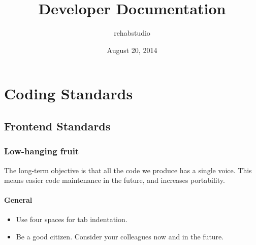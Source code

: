 \documentclass[letterpaper,10pt,english]{sphinxmanual}
\title{Developer Documentation}
\date{August 20, 2014}
\author{rehabstudio}
\begin{document}
\maketitle
\tableofcontents
{}\label{index::doc}



\chapter{Coding Standards}
\label{coding_standards/index:coding-standards}\label{coding_standards/index::doc}\label{coding_standards/index:rehabstudio-developers-documentation}

\section{Frontend Standards}
\label{coding_standards/frontend_standards:frontend-standards}\label{coding_standards/frontend_standards::doc}

\subsection{Low-hanging fruit}
\label{coding_standards/frontend_standards:low-hanging-fruit}
The long-term objective is that all the code we produce has a single voice. This means easier code maintenance in the future, and increases portability.


\subsubsection{General}
\label{coding_standards/frontend_standards:general}\begin{itemize}
\item {} 
Use four spaces for tab indentation.

\item {} 
Be a good citizen. Consider your colleagues now and in the future.

\end{itemize}
\end{document}
